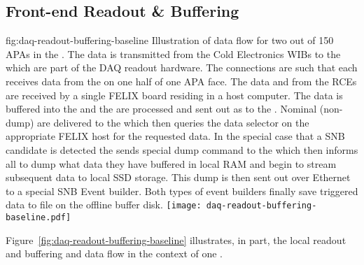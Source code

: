 

\subsection{Front-end Readout \& Buffering}
\label{sec:fd-daq-ltr}


\begin{dunefigure}{fig:daq-readout-buffering-baseline}
  {Illustration of data flow for two out of 150 APAs in the 
    . 
    The data is transmitted from the Cold Electronics WIBs to the
     which are part of the  DAQ 
    readout hardware. 
    The connections are such that each  receives data from
    the  on one half of one APA face.
    The data and  from the RCEs are received by
    a single FELIX board residing in a host computer. 
    The data is buffered into the  and the
     are processed and sent out as
     to the .
    Nominal (non-dump)  are delivered to the
     which then queries the data selector on the appropriate
    FELIX host for the requested data.
    In the special case that a SNB candidate is detected the
     sends special dump command to the  which
    then informs all  to dump what data they have buffered
    in local RAM and begin to stream subsequent data to local SSD
    storage.
    This dump is then sent out over Ethernet to a special SNB Event
    builder. 
    Both types of event builders finally save triggered data to file
    on the offline buffer disk.
    }  
  \texttt{[image: daq-readout-buffering-baseline.pdf]}%
\end{dunefigure}


Figure~\ref{fig:daq-readout-buffering-baseline} illustrates, in part,
the local readout and buffering and data flow in the context of one
.  

